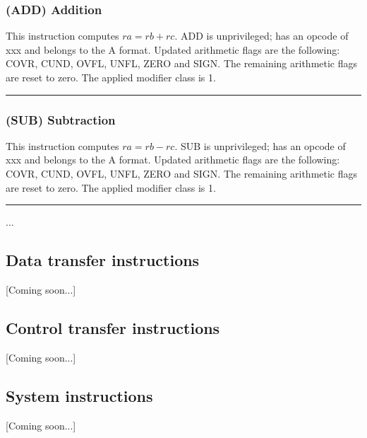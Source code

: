 \documentclass{article}
\begin{document}
            \subsubsection{(ADD) Addition}

                This instruction computes \(ra = rb + rc\). ADD is unprivileged; has an opcode of xxx and belongs to the A format. Updated arithmetic flags are the following: COVR, CUND, OVFL, UNFL, ZERO and SIGN. The remaining arithmetic flags are reset to zero. The applied modifier class is 1.

            \par\noindent\rule{\textwidth}{0.4pt}

            \subsubsection{(SUB) Subtraction}

                This instruction computes \(ra = rb - rc\). SUB is unprivileged; has an opcode of xxx and belongs to the A format. Updated arithmetic flags are the following: COVR, CUND, OVFL, UNFL, ZERO and SIGN. The remaining arithmetic flags are reset to zero. The applied modifier class is 1.

            \par\noindent\rule{\textwidth}{0.4pt}

            ...

        \subsection{Data transfer instructions}

            [Coming soon...]

        \subsection{Control transfer instructions}

            [Coming soon...]

        \subsection{System instructions}

            [Coming soon...]

    \clearpage

\end{document}

